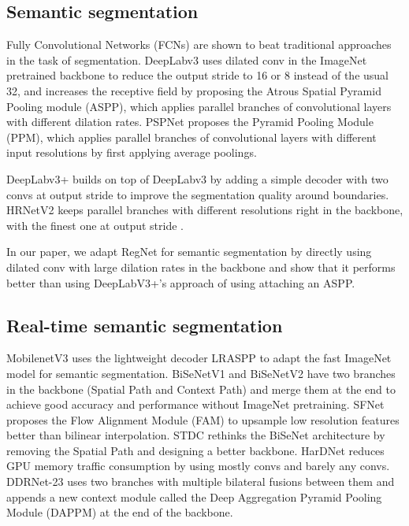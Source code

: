 \documentclass[10pt,twocolumn,letterpaper]{article}
\begin{document}
\subsection{Semantic segmentation}

Fully Convolutional Networks (FCNs)\cite{overfeat,fcn} are shown to beat traditional approaches in the task of segmentation. DeepLabv3\cite{deeplabv3} uses dilated conv in the ImageNet pretrained backbone to reduce the output stride to 16 or 8 instead of the usual 32, and increases the receptive field by proposing the Atrous Spatial Pyramid Pooling module (ASPP), which applies parallel branches of convolutional layers with different dilation rates. PSPNet\cite{pspnet} proposes the Pyramid Pooling Module (PPM), which applies parallel branches of convolutional layers with different input resolutions by first applying average poolings.

DeepLabv3+\cite{deeplabv3plus2018} builds on top of DeepLabv3 by adding a simple decoder with two  convs at output stride  to improve the segmentation quality around boundaries. HRNetV2\cite{hrnetv2} keeps parallel branches with different resolutions right in the backbone, with the finest one at output stride . 

In our paper, we adapt RegNet for semantic segmentation by directly using dilated conv with large dilation rates in the backbone and show that it performs better than using DeepLabV3+'s approach of using attaching an ASPP.



\subsection{Real-time semantic segmentation}
MobilenetV3 uses the lightweight decoder LRASPP\cite{mobilenetv32019} to adapt the fast ImageNet model for semantic segmentation. BiSeNetV1\cite{bisenetv1} and BiSeNetV2\cite{bisenetv2} have two branches in the backbone (Spatial Path and Context Path) and merge them at the end to achieve good accuracy and performance without ImageNet pretraining. SFNet\cite{sfnet} proposes the Flow Alignment Module (FAM) to upsample low resolution features better than bilinear interpolation. STDC\cite{stdc} rethinks the BiSeNet architecture by removing the Spatial Path and designing a better backbone. HarDNet\cite{hardnet} reduces GPU memory traffic consumption by using mostly  convs and barely any  convs. DDRNet-23\cite{ddrnet} uses two branches with multiple bilateral fusions between them and appends a new context module called the Deep Aggregation Pyramid Pooling Module (DAPPM) at the end of the backbone.
\end{document}
